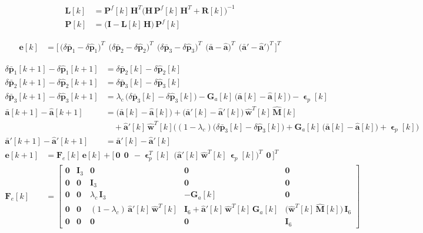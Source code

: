 \documentclass[11pt,a4paper]{ctexart}
\newcommand{\setline}[1]{\par\medskip\noindent{\small\textcolor[gray]{0.35}{#1}}}
\newcommand{\lc}{\lambda_c}
\newcommand{\dl}{\delta}
\newcommand{\bep}{\bm{\upvarepsilon}_p}
\newcommand{\av}{\bar{\mathbf a}}
\newcommand{\ah}{\hat{\mathbf a}}
\newcommand{\dpb}{\dl\bar{\mathbf p}}
\newcommand{\dph}{\dl\hat{\mathbf p}}
\newcommand{\Mh}{\hat{\mathbf M}}
\newcommand{\I}{\mathbf I}
\newcommand{\wh}{\hat{\mathbf w}}
\newcommand{\T}{T}
\begin{document}
\setline{estimator feedback matrix and error covariance}
\begin{align*}
\mathbf L[k] &= \mathbf P^f[k]\,\mathbf H^{\T}\big(\mathbf H\,\mathbf P^f[k]\,\mathbf H^{\T} + \mathbf R[k]\big)^{-1} \\
\mathbf P[k] &= \big(\I - \mathbf L[k]\,\mathbf H\big)\,\mathbf P^f[k]
\end{align*}
\setline{estimation error: true $-$ estimate}
\begin{align*}
\mathbf e[k] &= \big[\,\big(\dpb_1 - \dph_1\big)^{\T}\ \ \big(\dpb_2 - \dph_2\big)^{\T}\ \ \big(\dpb_3 - \dph_3\big)^{\T}\ \ \big(\av - \ah\big)^{\T}\ \ \big(\av' - \hat{\mathbf a}'\big)^{\T}\,\big]^{\T}
\end{align*}
\setline{dynamics of estimation errors, first order, without the feedback terms}
\begin{align*}
\dpb_1[k+1] - \dph_1[k+1] &= \dpb_2[k] - \dph_2[k] \\
\dpb_2[k+1] - \dph_2[k+1] &= \dpb_3[k] - \dph_3[k] \\
\dpb_3[k+1] - \dph_3[k+1] &= \lc\,\big(\dpb_3[k] - \dph_3[k]\big) - \mathbf G_a[k]\,\big(\av[k] - \ah[k]\big) - \bep[k] \\
\av[k+1] - \ah[k+1] &= \big(\av[k] - \ah[k]\big) + \big(\av'[k] - \hat{\mathbf a}'[k]\big)\,\wh^{\T}[k]\,\Mh[k] \\
&\quad + \hat{\mathbf a}'[k]\,\wh^{\T}[k]\Big((1-\lc)\big(\dpb_3[k] - \dph_3[k]\big) + \mathbf G_a[k]\,\big(\av[k] - \ah[k]\big) + \bep[k]\Big) \\
\av'[k+1] - \hat{\mathbf a}'[k+1] &= \av'[k] - \hat{\mathbf a}'[k]
\end{align*}
\begin{align*}
\mathbf e[k+1] &= \mathbf F_e[k]\,\mathbf e[k] + \big[\,\mathbf 0\ \ \mathbf 0\ \ -\bep^{\T}[k]\ \ \big(\hat{\mathbf a}'[k]\,\wh^{\T}[k]\,\bep[k]\big)^{\T}\ \ \mathbf 0\,\big]^{\T} \\
\mathbf F_e[k] &=
\begin{bmatrix}
\mathbf 0 & \I_3 & \mathbf 0 & \mathbf 0 & \mathbf 0 \\
\mathbf 0 & \mathbf 0 & \I_3 & \mathbf 0 & \mathbf 0 \\
\mathbf 0 & \mathbf 0 & \lc\,\I_3 & -\mathbf G_a[k] & \mathbf 0 \\
\mathbf 0 & \mathbf 0 & (1-\lc)\,\hat{\mathbf a}'[k]\,\wh^{\T}[k] & \I_6 + \hat{\mathbf a}'[k]\,\wh^{\T}[k]\,\mathbf G_a[k] & \big(\wh^{\T}[k]\,\Mh[k]\big)\,\I_6 \\
\mathbf 0 & \mathbf 0 & \mathbf 0 & \mathbf 0 & \I_6
\end{bmatrix}
\end{align*}
\end{document}

